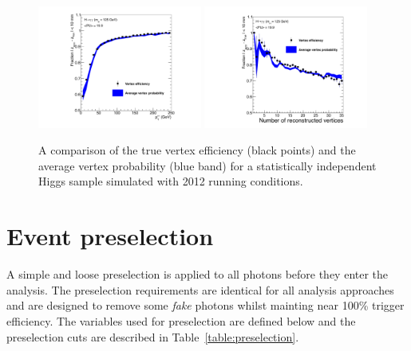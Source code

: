\begin{figure}
  \includegraphics[width=0.48\textwidth]{analysis_comps/plots/vtxProbPt.pdf}
  \includegraphics[width=0.48\textwidth]{analysis_comps/plots/vtxProbNvtx.pdf}
  \caption[A comparison of the true vertex efficiency and the average vertex probability]{A comparison of the true vertex efficiency (black points) and the average vertex probability (blue band) for a statistically independent \MC Higgs sample simulated with 2012 running conditions.}
  \label{fig:vertex_bdt_prob_efficiency}
\end{figure}

\section{Event preselection}
\label{sec:photon_presel}

A simple and loose preselection is applied to all photons before they enter the analysis. The preselection requirements are identical for all analysis approaches and are designed to remove some \emph{fake} photons whilst mainting near 100\% trigger efficiency. The variables used for preselection are defined below and the preselection cuts are described in Table~\ref{table:preselection}.

